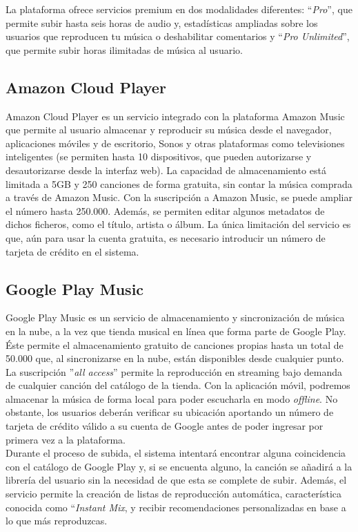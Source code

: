 La plataforma ofrece servicios premium en dos modalidades diferentes: ``\textit{Pro}'', que permite subir hasta seis horas de audio y, estadísticas ampliadas sobre los usuarios que reproducen tu música o deshabilitar comentarios y ``\textit{Pro Unlimited}'', que permite subir horas ilimitadas de música al usuario.

\subsection{Amazon Cloud Player \cite{ACP}} 
Amazon Cloud Player es un servicio integrado con la plataforma Amazon Music que permite al usuario almacenar y reproducir su música desde el navegador, aplicaciones móviles y de escritorio, Sonos y otras plataformas como televisiones inteligentes (se permiten hasta 10 dispositivos, que pueden autorizarse y desautorizarse desde la interfaz web). La capacidad de almacenamiento está limitada a 5GB y 250 canciones de forma gratuita, sin contar la música comprada a través de Amazon Music. Con la suscripción a Amazon Music, se puede ampliar el número hasta 250.000. Además, se permiten editar algunos metadatos de dichos ficheros, como el título, artista o álbum. La única limitación del servicio es que, aún para usar la cuenta gratuita, es necesario introducir un número de tarjeta de crédito en el sistema.

\subsection{Google Play Music \cite{GPM}}
Google Play Music es un servicio de almacenamiento y sincronización de música en la nube, a la vez que tienda musical en línea que forma parte de Google Play. Éste permite el almacenamiento gratuito de canciones propias hasta un total de 50.000 que, al sincronizarse en la nube, están disponibles desde cualquier punto. La suscripción ''\textit{all access}'' permite la reproducción en streaming bajo demanda de cualquier canción del catálogo de la tienda. Con la aplicación móvil, podremos almacenar la música de forma local para poder escucharla en modo \textit{offline}. No obstante, los usuarios deberán verificar su ubicación aportando un número de tarjeta de crédito válido a su cuenta de Google antes de poder ingresar por primera vez a la plataforma.\\

Durante el proceso de subida, el sistema intentará encontrar alguna coincidencia con el catálogo de Google Play y, si se encuenta alguno, la canción se añadirá a la librería del usuario sin la necesidad de que esta se complete de subir. Además, el servicio permite la creación de listas de reproducción automática, característica conocida como ``\textit{Instant Mix}, y recibir recomendaciones personalizadas en base a lo que más reproduzcas.

